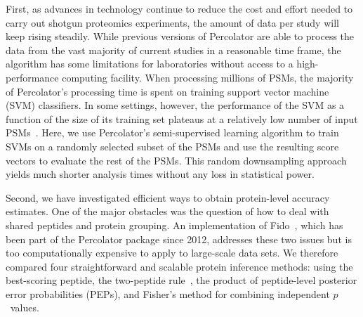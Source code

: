 \documentclass{article}
\begin{document}
First, as advances in technology continue to reduce the cost and
effort needed to carry out shotgun proteomics experiments, the amount
of data per study will keep rising steadily. While previous versions
of Percolator are able to process the data from the vast majority of
current studies in a reasonable time frame, the algorithm has some
limitations for laboratories without access to a high-performance
computing facility. When processing millions of PSMs, the majority of
Percolator's processing time is spent on training support vector
machine (SVM) classifiers.  In some settings, however, the performance
of the SVM as a function of the size of its training set plateaus at
a relatively low number of input PSMs~\cite{gonnelli2015decoy}. Here,
we use Percolator's semi-supervised learning algorithm to train SVMs
on a randomly selected subset of the PSMs and use the resulting score
vectors to evaluate the rest of the PSMs.  This random downsampling
approach yields much shorter analysis times without any loss in
statistical power.

Second, we have investigated efficient ways to obtain protein-level 
accuracy estimates. One of the major obstacles was the question of how 
to deal with shared peptides and protein grouping. An implementation 
of Fido~\cite{serang2010efficient}, which has been part of the 
Percolator package since 2012, addresses these two issues but is too 
computationally expensive to apply to large-scale data sets. We 
therefore compared four straightforward and scalable protein inference 
methods: using the best-scoring peptide, the two-peptide 
rule~\cite{carr2004need, gupta2009false}, the product of 
peptide-level posterior error probabilities (PEPs), and Fisher's 
method for combining independent $p$~values.
\end{document}
